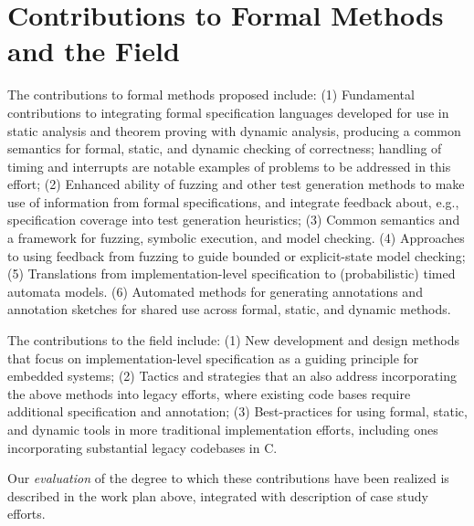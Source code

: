 \section{Contributions to Formal Methods and the Field}

The contributions to formal methods proposed include: (1)
Fundamental contributions to integrating formal specification
languages developed for use in static analysis and theorem proving
with dynamic analysis, producing a common semantics for formal,
static, and dynamic checking of correctness; handling of timing and
interrupts are notable examples of problems to be addressed in this effort;
(2) Enhanced ability of fuzzing and other test generation methods to
make use of information from formal specifications, and integrate
feedback about, e.g., specification coverage into test generation
heuristics;
(3) Common semantics and a framework for fuzzing, symbolic execution,
and model checking.
(4) Approaches to using feedback from fuzzing to guide bounded or explicit-state model
checking;
(5) Translations from implementation-level specification to
(probabilistic) timed automata models.
(6) Automated methods for generating annotations and annotation
sketches for shared use across formal, static, and dynamic methods.

The contributions to the field include:
(1)  New development and design methods that focus on
implementation-level specification as a guiding
principle for embedded systems; (2) Tactics and strategies that an
also address incorporating the above methods into
legacy efforts, where existing code bases require additional
specification and annotation; (3) Best-practices for using formal, static, and dynamic tools in
more traditional implementation efforts, including ones incorporating
substantial legacy codebases in C.


Our \emph{evaluation} of the degree to which these contributions have
been realized is described in the work plan above, integrated with
description of case study efforts.